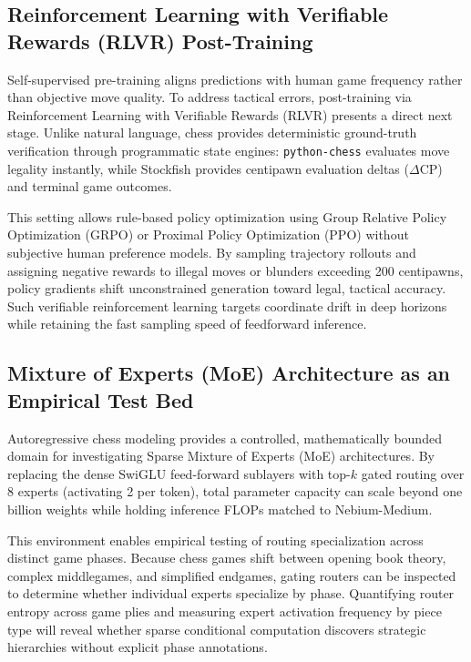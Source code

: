 \subsection{Reinforcement Learning with Verifiable Rewards (RLVR) Post-Training}
\label{sec:future_rlvr}

Self-supervised pre-training aligns predictions with human game frequency rather than objective move quality. To address tactical errors, post-training via Reinforcement Learning with Verifiable Rewards (RLVR) presents a direct next stage. Unlike natural language, chess provides deterministic ground-truth verification through programmatic state engines: \texttt{python-chess} evaluates move legality instantly, while Stockfish provides centipawn evaluation deltas ($\Delta\text{CP}$) and terminal game outcomes.

This setting allows rule-based policy optimization using Group Relative Policy Optimization (GRPO) or Proximal Policy Optimization (PPO) without subjective human preference models. By sampling trajectory rollouts and assigning negative rewards to illegal moves or blunders exceeding 200 centipawns, policy gradients shift unconstrained generation toward legal, tactical accuracy. Such verifiable reinforcement learning targets coordinate drift in deep horizons while retaining the fast sampling speed of feedforward inference.


\subsection{Mixture of Experts (MoE) Architecture as an Empirical Test Bed}
\label{sec:future_moe}

Autoregressive chess modeling provides a controlled, mathematically bounded domain for investigating Sparse Mixture of Experts (MoE) architectures. By replacing the dense SwiGLU feed-forward sublayers with top-$k$ gated routing over 8 experts (activating 2 per token), total parameter capacity can scale beyond one billion weights while holding inference FLOPs matched to Nebium-Medium.

This environment enables empirical testing of routing specialization across distinct game phases. Because chess games shift between opening book theory, complex middlegames, and simplified endgames, gating routers can be inspected to determine whether individual experts specialize by phase. Quantifying router entropy across game plies and measuring expert activation frequency by piece type will reveal whether sparse conditional computation discovers strategic hierarchies without explicit phase annotations.
